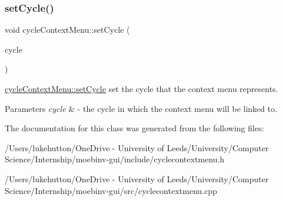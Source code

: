 \subsubsection{\texorpdfstring{set\+Cycle()}{setCycle()}}
{\footnotesize\ttfamily void cycle\+Context\+Menu\+::set\+Cycle (\begin{DoxyParamCaption}\item[{Gi\+Na\+C\+::ex}]{cycle }\end{DoxyParamCaption})}



\mbox{\hyperlink{classcycle_context_menu_adf29caf51604118b6ced6a02c5172252}{cycle\+Context\+Menu\+::set\+Cycle}} set the cycle that the context menu represents. 


\begin{DoxyParams}{Parameters}
{\em cycle} & -\/ the cycle in which the context menu will be \textquotesingle{}linked\textquotesingle{} to. \\
\hline
\end{DoxyParams}


The documentation for this class was generated from the following files\+:\begin{DoxyCompactItemize}
\item 
/\+Users/lukehutton/\+One\+Drive -\/ University of Leeds/\+University/\+Computer Science/\+Internship/moebinv-\/gui/include/cyclecontextmenu.\+h\item 
/\+Users/lukehutton/\+One\+Drive -\/ University of Leeds/\+University/\+Computer Science/\+Internship/moebinv-\/gui/src/cyclecontextmenu.\+cpp\end{DoxyCompactItemize}
